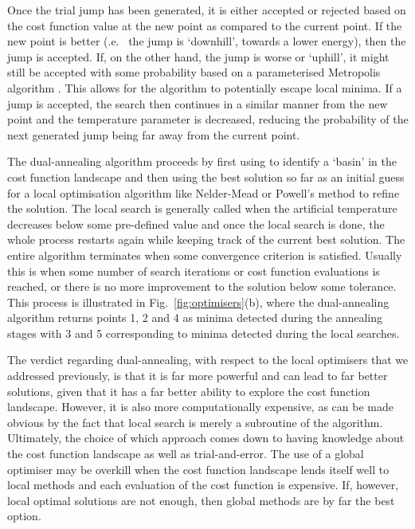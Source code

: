 Once the trial jump has been generated, it is either accepted or rejected based on the cost function value at the new point as compared to the current point. If the new point is better (\@i.e.~ the jump is `downhill', towards a lower energy), then the jump is accepted. If, on the other hand, the jump is worse or `uphill', it might still be accepted with some probability based on a parameterised Metropolis algorithm \cite{chib_understanding_1995}. This allows for the algorithm to potentially escape local minima. If a jump is accepted, the search then continues in a similar manner from the new point and the temperature parameter is decreased, reducing the probability of the next generated jump being far away from the current point.

The dual-annealing algorithm proceeds by first using  to identify a `basin' in the cost function landscape and then using the best solution so far as an initial guess for a local optimisation algorithm like Nelder-Mead or Powell's method to refine the solution. The local search is generally called when the artificial temperature decreases below some pre-defined value and once the local search is done, the whole process restarts again while keeping track of the current best solution. The entire algorithm terminates when some convergence criterion is satisfied. Usually this is when some number of search iterations or cost function evaluations is reached, or there is no more improvement to the solution below some tolerance. This process is illustrated in Fig.~\ref{fig:optimisers}(b), where the dual-annealing algorithm returns points 1, 2 and 4 as minima detected during the annealing stages with 3 and 5 corresponding to minima detected during the local searches. 

The verdict regarding dual-annealing, with respect to the local optimisers that we addressed previously, is that it is far more powerful and can lead to far better solutions, given that it has a far better ability to explore the cost function landscape. However, it is also more computationally expensive, as can be made obvious by the fact that local search is merely a subroutine of the algorithm. Ultimately, the choice of which approach comes down to having knowledge about the cost function landscape as well as trial-and-error. The use of a global optimiser may be overkill when the cost function landscape lends itself well to local methods and each evaluation of the cost function is expensive. If, however, local optimal solutions are not enough, then global methods are by far the best option.


